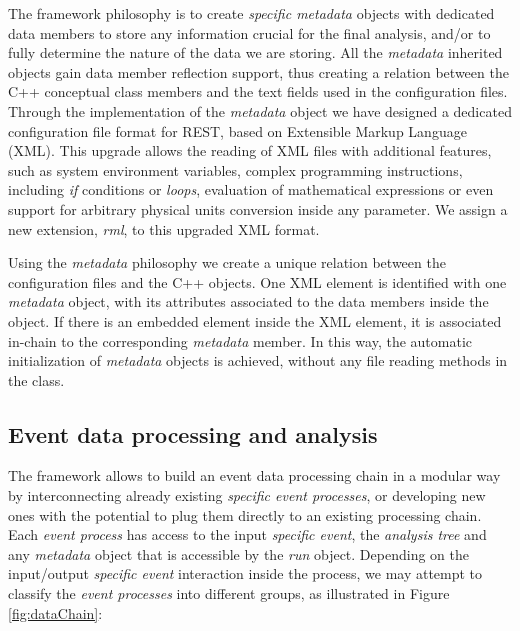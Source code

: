The framework philosophy is to create \emph{specific metadata} objects with dedicated data members to store any information crucial for the final analysis, and/or to fully determine the nature of the data we are storing. All the \emph{metadata} inherited objects gain data member reflection support, thus creating a relation between the C++ conceptual class members and the text fields used in the configuration files. Through the implementation of the \emph{metadata} object we have designed a dedicated configuration file format for REST, based on Extensible Markup Language (XML). This upgrade allows the reading of XML files with additional features, such as system environment variables, complex programming instructions, including \emph{if} conditions or \emph{loops}, evaluation of mathematical expressions or even support for arbitrary physical units conversion inside any parameter. We assign a new extension, \emph{rml}, to this upgraded XML format.

Using the \emph{metadata} philosophy we create a unique relation between the configuration files and the C++ objects. One XML element is identified with one \emph{metadata} object, with its attributes associated to the data members inside the object. If there is an embedded element inside the XML element, it is associated in-chain to the corresponding \emph{metadata} member. In this way, the automatic initialization of \emph{metadata} objects is achieved, without any file reading methods in the class.

\subsection{Event data processing and analysis}

The framework allows to build an event data processing chain in a modular way by interconnecting already existing \emph{specific event processes}, or developing new ones with the potential to plug them directly to an existing processing chain. Each \emph{event process} has access to the input \emph{specific event}, the \emph{analysis tree} and any \emph{metadata} object that is accessible by the \emph{run} object. Depending on the input/output \emph{specific event} interaction inside the process, we may attempt to classify the \emph{event processes} into different groups, as illustrated in Figure\,\ref{fig:dataChain}:

